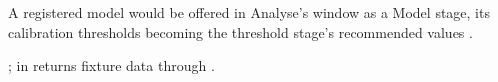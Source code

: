 A registered model would be offered in Analyse's  window as a Model stage, its
calibration thresholds becoming the threshold stage's recommended values .

\begin{underthehood}
;  in
 returns fixture data through .
\end{underthehood}
